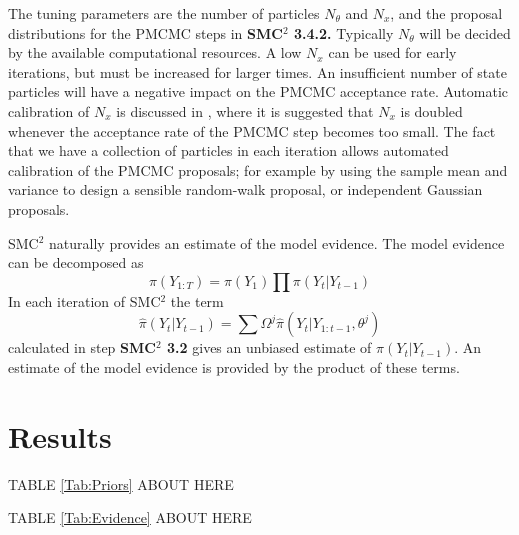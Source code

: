 \documentclass[a4paper,12pt]{article}
\begin{document}
\noindent The tuning parameters are the number of particles $N_\theta$ and $N_x$, and the proposal distributions for the PMCMC steps in {\bf SMC$^2$ 3.4.2.} Typically $N_\theta$ will be decided by the available computational resources.
A low $N_x$ can be used for early iterations, but must be increased for larger times.
An insufficient number of state particles will have a negative impact on the PMCMC acceptance rate.
Automatic calibration of $N_x$ is discussed in \cite{Chopin2012}, where it is suggested that $N_x$ is doubled whenever the acceptance rate of the PMCMC step becomes too small.
The fact that we have a collection of particles in each iteration allows automated calibration of the PMCMC proposals; for example by using the sample mean and variance to design a sensible random-walk proposal, or independent Gaussian proposals.

SMC$^2$ naturally provides an estimate of the model evidence.
The model evidence can be decomposed as 
\begin{equation}
\pi(Y_{1:T}) = \pi(Y_1) \prod \pi(Y_t \vert Y_{t-1})
\end{equation}
\noindent In each iteration of SMC$^2$ the term 
\[ \hat{\pi}(Y_t \vert Y_{t-1}) = \sum \Omega^j \hat{\pi} (Y_t \vert Y_{1:t-1}, \theta^j) \]
\noindent calculated in step {\bf SMC$^2$ 3.2} gives an unbiased estimate of $\pi(Y_t \vert Y_{t-1})$.
An estimate of the model evidence is provided by the product of these terms.

\section{Results}
\label{Sec:Results}



\begin{center}
\begin{LARGE}
TABLE \ref{Tab:Priors} ABOUT HERE
\end{LARGE}
\end{center}




\begin{center}
\begin{LARGE}
TABLE \ref{Tab:Evidence} ABOUT HERE
\end{LARGE}
\end{center}
\end{document}
